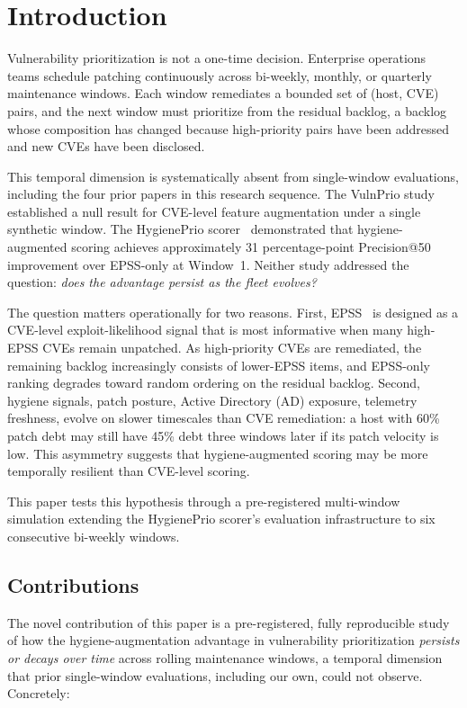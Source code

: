 \section{Introduction}

Vulnerability prioritization is not a one-time decision. Enterprise operations teams schedule patching continuously across bi-weekly, monthly, or quarterly maintenance windows. Each window remediates a bounded set of (host, CVE) pairs, and the next window must prioritize from the residual backlog, a backlog whose composition has changed because high-priority pairs have been addressed and new CVEs have been disclosed.

This temporal dimension is systematically absent from single-window evaluations, including the four prior papers in this research sequence. The VulnPrio study~\cite{paper1vulnprio} established a null result for CVE-level feature augmentation under a single synthetic window. The HygienePrio scorer~\cite{paper4hygieneprio} demonstrated that hygiene-augmented scoring achieves approximately 31 percentage-point Precision@50 improvement over EPSS-only at Window~1. Neither study addressed the question: \textit{does the advantage persist as the fleet evolves?}

The question matters operationally for two reasons. First, EPSS~\cite{jacobs2021epss} is designed as a CVE-level exploit-likelihood signal that is most informative when many high-EPSS CVEs remain unpatched. As high-priority CVEs are remediated, the remaining backlog increasingly consists of lower-EPSS items, and EPSS-only ranking degrades toward random ordering on the residual backlog. Second, hygiene signals, patch posture, Active Directory (AD) exposure, telemetry freshness, evolve on slower timescales than CVE remediation: a host with 60\% patch debt may still have 45\% debt three windows later if its patch velocity is low. This asymmetry suggests that hygiene-augmented scoring may be more temporally resilient than CVE-level scoring.

This paper tests this hypothesis through a pre-registered multi-window simulation extending the HygienePrio scorer's evaluation infrastructure to six consecutive bi-weekly windows.

\subsection{Contributions}

The novel contribution of this paper is a pre-registered, fully reproducible study of how the hygiene-augmentation advantage in vulnerability prioritization \textit{persists or decays over time} across rolling maintenance windows, a temporal dimension that prior single-window evaluations, including our own, could not observe. Concretely:

